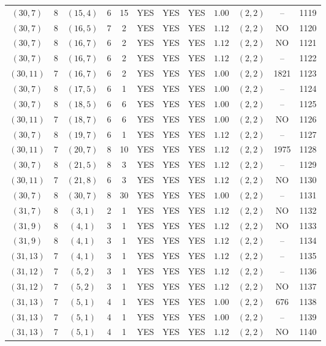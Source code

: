 \begin{longtable}{|c|c|c|c|c|c|c|c|c|c|c|c|}
$(30,7)$ & 8 & $(15,4)$ & 6 & 15 & YES & YES & YES & $1.00$ & $(2,2)$ & -- & 1119\\
$(30,7)$ & 8 & $(16,5)$ & 7 & 2 & YES & YES & YES & $1.12$ & $(2,2)$ & NO & 1120\\
$(30,7)$ & 8 & $(16,7)$ & 6 & 2 & YES & YES & YES & $1.12$ & $(2,2)$ & NO & 1121\\
$(30,7)$ & 8 & $(16,7)$ & 6 & 2 & YES & YES & YES & $1.12$ & $(2,2)$ & -- & 1122\\
$(30,11)$ & 7 & $(16,7)$ & 6 & 2 & YES & YES & YES & $1.00$ & $(2,2)$ & 1821 & 1123\\
$(30,7)$ & 8 & $(17,5)$ & 6 & 1 & YES & YES & YES & $1.00$ & $(2,2)$ & -- & 1124\\
$(30,7)$ & 8 & $(18,5)$ & 6 & 6 & YES & YES & YES & $1.00$ & $(2,2)$ & -- & 1125\\
$(30,11)$ & 7 & $(18,7)$ & 6 & 6 & YES & YES & YES & $1.00$ & $(2,2)$ & NO & 1126\\
$(30,7)$ & 8 & $(19,7)$ & 6 & 1 & YES & YES & YES & $1.12$ & $(2,2)$ & -- & 1127\\
$(30,11)$ & 7 & $(20,7)$ & 8 & 10 & YES & YES & YES & $1.12$ & $(2,2)$ & 1975 & 1128\\
$(30,7)$ & 8 & $(21,5)$ & 8 & 3 & YES & YES & YES & $1.12$ & $(2,2)$ & -- & 1129\\
$(30,11)$ & 7 & $(21,8)$ & 6 & 3 & YES & YES & YES & $1.12$ & $(2,2)$ & NO & 1130\\
$(30,7)$ & 8 & $(30,7)$ & 8 & 30 & YES & YES & YES & $1.00$ & $(2,2)$ & -- & 1131\\
$(31,7)$ & 8 & $(3,1)$ & 2 & 1 & YES & YES & YES & $1.12$ & $(2,2)$ & NO & 1132\\
$(31,9)$ & 8 & $(4,1)$ & 3 & 1 & YES & YES & YES & $1.12$ & $(2,2)$ & NO & 1133\\
$(31,9)$ & 8 & $(4,1)$ & 3 & 1 & YES & YES & YES & $1.12$ & $(2,2)$ & -- & 1134\\
$(31,13)$ & 7 & $(4,1)$ & 3 & 1 & YES & YES & YES & $1.12$ & $(2,2)$ & -- & 1135\\
$(31,12)$ & 7 & $(5,2)$ & 3 & 1 & YES & YES & YES & $1.12$ & $(2,2)$ & -- & 1136\\
$(31,12)$ & 7 & $(5,2)$ & 3 & 1 & YES & YES & YES & $1.12$ & $(2,2)$ & NO & 1137\\
$(31,13)$ & 7 & $(5,1)$ & 4 & 1 & YES & YES & YES & $1.00$ & $(2,2)$ & 676 & 1138\\
$(31,13)$ & 7 & $(5,1)$ & 4 & 1 & YES & YES & YES & $1.00$ & $(2,2)$ & -- & 1139\\
$(31,13)$ & 7 & $(5,1)$ & 4 & 1 & YES & YES & YES & $1.12$ & $(2,2)$ & NO & 1140\\

\end{longtable}
